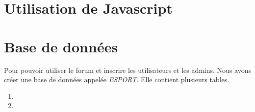 \documentclass[a4paper, 11pt]{article}
\begin{document}
\section{Utilisation de Javascript}

\section{Base de données}
Pour pouvoir utiliser le forum et inscrire les utilisateurs et les admins.
Nous avons créer une base de données appelée \textit{ESPORT}.
Elle contient plusieurs tables.
\begin{enumerate}
\item %
\item %
\end{enumerate}
\end{document}
